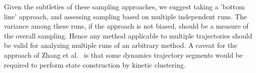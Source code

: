 Given the subtleties of these sampling approaches, we suggest taking a 'bottom line' approach, and assessing sampling based on multiple independent runs.
The variance among these runs, if the approach is not biased, should be a measure of the overall sampling.
Hence any method applicable to multiple trajectories should be valid for analyzing multiple runs of an arbitrary method.
A caveat for the approach of Zhang et al.\ \cite{Zhang2010} is that some dynamics trajectory segments would be required to perform state construction by kinetic clustering.

